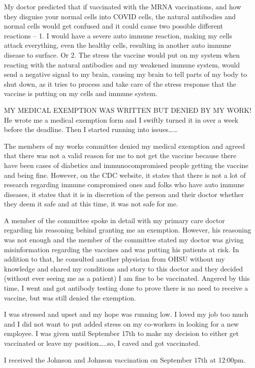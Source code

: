 My doctor predicted that if vaccinated with the MRNA vaccinations, and how they
disguise your normal cells into COVID cells, the natural antibodies and normal
cells would get confused and it could cause two possible different reactions –
1. I would have a severe auto immune reaction, making my cells attack
everything, even the healthy cells, resulting in another auto immune disease to
surface. Or 2. The stress the vaccine would put on my system when reacting with
the natural antibodies and my weakened immune system, would send a negative
signal to my brain, causing my brain to tell parts of my body to shut down, as
it tries to process and take care of the stress response that the vaccine is
putting on my cells and immune system.

MY MEDICAL EXEMPTION WAS WRITTEN BUT DENIED BY MY WORK! He wrote me a medical
exemption form and I swiftly turned it in over a week before the deadline. Then
I started running into issues……

The members of my works committee denied my medical exemption and agreed that
there was not a valid reason for me to not get the vaccine because there have
been cases of diabetics and immunocompromised people getting the vaccine and
being fine. However, on the CDC website, it states that there is not a lot of
research regarding immune compromised ones and folks who have auto immune
diseases, it states that it is in discretion of the person and their doctor
whether they deem it safe and at this time, it was not safe for me.

A member of the committee spoke in detail with my primary care doctor regarding
his reasoning behind granting me an exemption. However, his reasoning was not
enough and the member of the committee stated my doctor was giving
misinformation regarding the vaccines and was putting his patients at risk. In
addition to that, he consulted another physician from OHSU without my knowledge
and shared my conditions and story to this doctor and they decided (without ever
seeing me as a patient) I am fine to be vaccinated. Angered by this time, I went
and got antibody testing done to prove there is no need to receive a vaccine,
but was still denied the exemption.

I was stressed and upset and my hope was running low. I loved my job too much
and I did not want to put added stress on my co-workers in looking for a new
employee. I was given until September 17th to make my decision to either get
vaccinated or leave my position…..so, I caved and got vaccinated.

I received the Johnson and Johnson vaccination on September 17th at 12:00pm.
